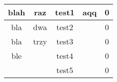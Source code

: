 \documentclass{article}
\begin{document}
\begin{tabular}{|c|c|c|c|c|}\hline
blah & raz & test1 & aqq
 & 0\\
\hline
bla & dwa & test2 &  & 0\\
\hline
bla & trzy
 & test3 &  & 0\\
\hline
ble
 &  & test4 &  & 0\\
\hline
 &  & test5
 &  & 0\\
\hline
\end{tabular}
\end{document}
